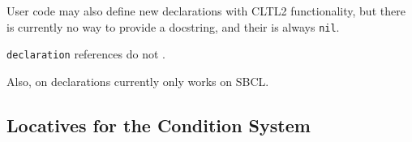 \begin{itemize}
  User code may also define new declarations with CLTL2 functionality,
  but there is currently no way to provide a docstring, and their
   is always
  \texttt{nil}.

\begin{Shaded}
\begin{Highlighting}[]
\NormalTok{  (} 
\end{Highlighting}
\end{Shaded}

  \texttt{declaration} references do not
  .

  Also,
  on declarations currently only works on SBCL.
\end{itemize}

\subsection{Locatives for the Condition
System}\label{locatives-for-the-condition-system}

\label{x-28DREF-3A-40CONDITION-SYSTEM-LOCATIVES-20MGL-PAX-3ASECTION-29}


